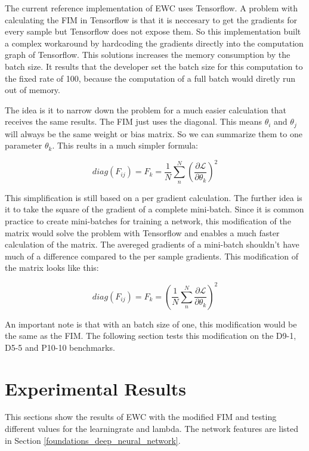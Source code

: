 The current reference implementation of EWC uses Tensorflow.
A problem with calculating the FIM in Tensorflow is that it is neccesary to get the gradients for every sample but Tensorflow does not expose them.
So this implementation built a complex workaround by hardcoding the gradients directly into the computation graph of Tensorflow.
This solutions increases the memory consumption by the batch size.
It results that the developer set the batch size for this computation to the fixed rate of 100, because the computation of a full batch would diretly run out of memory.
\cite{github_ewc_issue1}




The idea is it to narrow down the problem for a much easier calculation that receives the same results.
The FIM just uses the diagonal.
This means $\theta_i$ and $\theta_j$ will always be the same weight or bias matrix.
So we can summarize them to one parameter $\theta_k$.
This reults in a much simpler formula:

$$diag \left(F_{ij}\right) = F_k = \frac{1}{N} \sum_{n}^{N} \left( \frac{\partial \mathcal{L}}{\partial \theta_{k}} \right)^2$$

This simplification is still  based on a per gradient calculation.
The further idea is it to take the square of the gradient of a complete mini-batch.
Since it is common practice to create mini-batches for training a network, this modification of the matrix would solve the problem with Tensorflow and enables a much faster calculation of the matrix.
The avereged gradients of a mini-batch shouldn't have much of a difference compared to the per sample gradients.
This modification of the matrix looks like this:

$$diag \left(F_{ij}\right) = F_k = \left( \frac{1}{N} \sum_{n}^{N} \frac{\partial \mathcal{L}}{\partial \theta_{k}} \right)^2$$

An important note is that with an batch size of one, this modification would be the same as the FIM. 
The following section tests this modification on the D9-1, D5-5 and P10-10 benchmarks.

\newpage
\section{Experimental Results}

This sections show the results of EWC with the modified FIM and testing different values for the learningrate and lambda.
The network features are listed in Section \ref{foundations_deep_neural_network}.

